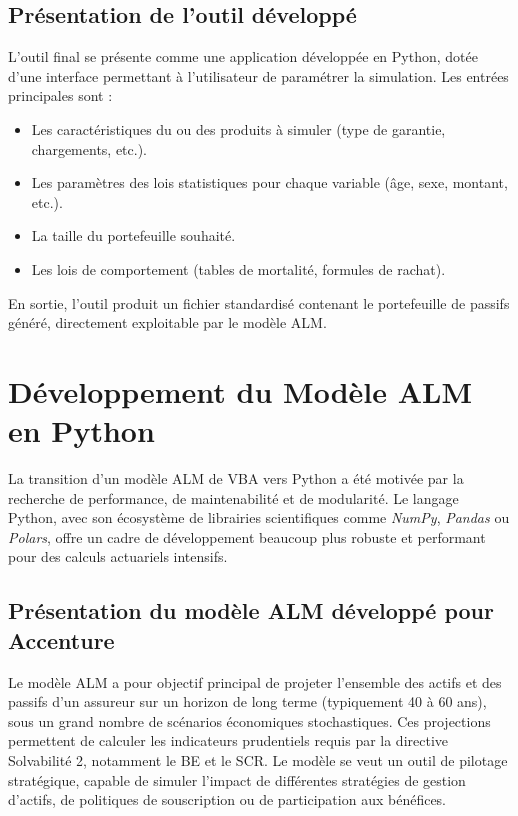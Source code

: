\subsection{Présentation de l'outil développé}

L'outil final se présente comme une application développée en Python, dotée d'une interface permettant à l'utilisateur de paramétrer la simulation. Les entrées principales sont :
\begin{itemize}
    \item Les caractéristiques du ou des produits à simuler (type de garantie, chargements, etc.).
    \item Les paramètres des lois statistiques pour chaque variable (âge, sexe, montant, etc.).
    \item La taille du portefeuille souhaité.
    \item Les lois de comportement (tables de mortalité, formules de rachat).
\end{itemize}
En sortie, l'outil produit un fichier standardisé contenant le portefeuille de passifs généré, directement exploitable par le modèle ALM.

\section{Développement du Modèle ALM en Python}

La transition d'un modèle ALM de VBA vers Python a été motivée par la recherche de performance, de maintenabilité et de modularité. Le langage Python, avec son écosystème de librairies scientifiques comme \textit{NumPy}, \textit{Pandas} ou \textit{Polars}, offre un cadre de développement beaucoup plus robuste et performant pour des calculs actuariels intensifs.

\subsection{Présentation du modèle ALM développé pour Accenture}

Le modèle ALM a pour objectif principal de projeter l'ensemble des actifs et des passifs d'un assureur sur un horizon de long terme (typiquement 40 à 60 ans), sous un grand nombre de scénarios économiques stochastiques. Ces projections permettent de calculer les indicateurs prudentiels requis par la directive Solvabilité 2, notamment le BE et le SCR. Le modèle se veut un outil de pilotage stratégique, capable de simuler l'impact de différentes stratégies de gestion d'actifs, de politiques de souscription ou de participation aux bénéfices.

